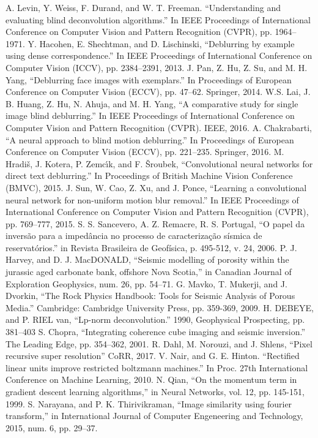 \documentclass[conference]{IEEEtran}
\begin{document}
\begin{thebibliography}{00}
			A. Levin, Y. Weiss, F. Durand, and W. T. Freeman. ``Understanding and evaluating blind deconvolution algorithms.'' In IEEE Proceedings of International Conference on Computer Vision and Pattern Recognition (CVPR), pp. 1964–1971.
		Y. Hacohen, E. Shechtman, and D. Lischinski, ``Deblurring by example using dense correspondence.'' In IEEE Proceedings of International Conference on Computer Vision (ICCV), pp. 2384–2391, 2013.
		J. Pan, Z. Hu, Z. Su, and M. H. Yang, ``Deblurring face images with exemplars.'' In Proceedings of European Conference on Computer Vision (ECCV), pp. 47–62. Springer, 2014.
		W.S. Lai, J. B. Huang, Z. Hu, N. Ahuja, and M. H. Yang, ``A comparative study for single image blind deblurring.'' In IEEE Proceedings of International Conference on Computer Vision and Pattern Recognition (CVPR). IEEE, 2016.
	A. Chakrabarti, ``A neural approach to blind motion deblurring.'' In Proceedings of European Conference on Computer Vision (ECCV), pp. 221–235. Springer, 2016.
		M. Hradiš, J. Kotera, P. Zemcı́k, and F. Šroubek, ``Convolutional neural networks for direct text deblurring.'' In Proceedings of British Machine Vision Conference (BMVC), 2015.
		J. Sun, W. Cao, Z. Xu, and J. Ponce, ``Learning a convolutional neural network for non-uniform motion blur removal.'' In IEEE Proceedings of International Conference on Computer Vision and Pattern Recognition (CVPR), pp. 769–777, 2015.
		S. S. Sancevero, A. Z. Remacre, R. S. Portugal, ``O papel da inversão para a impedância no processo de caracterização sísmica de reservatórios.'' in Revista Brasileira de Geofísica, p. 495-512, v. 24, 2006.
 		P. J. Harvey, and D. J. MacDONALD, ``Seismic modelling of porosity within the jurassic aged carbonate bank, offshore Nova Scotia,'' in  Canadian Journal of Exploration Geophysics, num. 26, pp. 54–71.
		G. Mavko, T. Mukerji, and J. Dvorkin, ``The Rock Physics Handbook: Tools for Seismic Analysis of Porous Media.'' Cambridge: Cambridge University Press, pp. 359-369, 2009.
		H. DEBEYE, and P. RIEL van, ``Lp-norm deconvolution.'' 1990, Geophysical Prospecting, pp. 381–403
		S. Chopra, ``Integrating coherence cube imaging and seismic inversion.'' The Leading Edge, pp. 354–362, 2001.
		R. Dahl, M. Norouzi, and J. Shlens, ``Pixel recursive super resolution'' CoRR, 2017.
 		V. Nair, and G. E. Hinton. ``Rectified linear units improve restricted boltzmann machines.'' In Proc. 27th International Conference on Machine Learning, 2010.
		N. Qian, ``On the momentum term in gradient descent learning algorithms,'' in Neural Networks, vol. 12, pp. 145-151, 1999.
		S. Narayana, and P. K. Thirivikraman, ``Image similarity using fourier transform,'' in International Journal of Computer Engeneering and Technology, 2015, num. 6, pp. 29–37.
\end{thebibliography}
\end{document}
